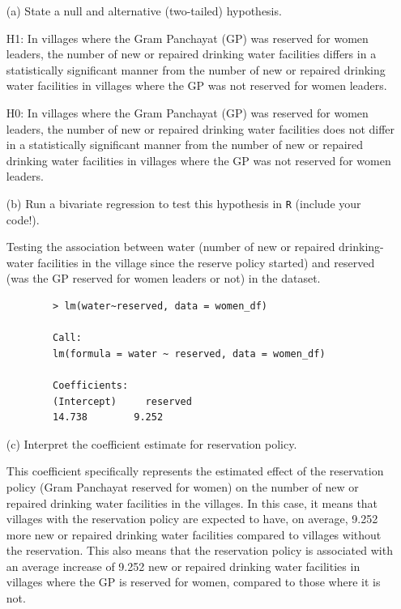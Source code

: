 \documentclass[12pt,letterpaper]{article}
\begin{document}
\newpage
\begin{enumerate}
	\item [(a)] State a null and alternative (two-tailed) hypothesis. 
	
	H1: 
	In villages where the Gram Panchayat (GP) was reserved for women leaders, the number of new or repaired drinking water facilities differs in a statistically significant manner from the number of new or repaired drinking water facilities in villages where the GP was not reserved for women leaders.
	
	H0:
	In villages where the Gram Panchayat (GP) was reserved for women leaders, the number of new or repaired drinking water facilities does not differ in a statistically significant manner from the number of new or repaired drinking water facilities in villages where the GP was not reserved for women leaders.
	
	\item [(b)] Run a bivariate regression to test this hypothesis in \texttt{R} (include your code!).
	
	Testing the association between water (number of new or repaired drinking-water facilities in the village since the reserve policy started) and reserved (was the GP reserved for women leaders or not) in the dataset.
	\begin{verbatim}	
		> lm(water~reserved, data = women_df)
		
		Call:
		lm(formula = water ~ reserved, data = women_df)
		
		Coefficients:
		(Intercept)     reserved  
		14.738        9.252  
	\end{verbatim}
	
	\item [(c)] Interpret the coefficient estimate for reservation policy. 
	
	This coefficient specifically represents the estimated effect of the reservation policy (Gram Panchayat reserved for women) on the number of new or repaired drinking water facilities in the villages. 
	In this case, it means that villages with the reservation policy are expected to have, on average, 9.252 more new or repaired drinking water facilities compared to villages without the reservation.
	This also means that the reservation policy is associated with an average increase of 9.252 new or repaired drinking water facilities in villages where the GP is reserved for women, compared to those where it is not.
\end{enumerate}
\end{document}
